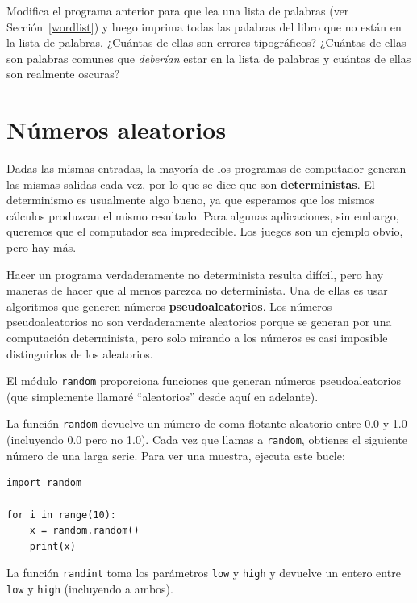 \documentclass[10pt]{book}
\begin{document}
\begin{exercise}

Modifica el programa anterior para que lea una lista de palabras (ver
Sección~\ref{wordlist}) y luego imprima todas las palabras del libro que
no están en la lista de palabras.  ¿Cuántas de ellas son errores tipográficos?
¿Cuántas de ellas son palabras comunes que {\em deberían} estar en la lista
de palabras y cuántas de ellas son realmente oscuras?

\end{exercise}


\section{Números aleatorios}

Dadas las mismas entradas, la mayoría de los programas de computador generan
las mismas salidas cada vez, por lo que se dice que son {\bf deterministas}.
El determinismo es usualmente algo bueno, ya que esperamos que los mismos
cálculos produzcan el mismo resultado.  Para algunas aplicaciones, sin embargo,
queremos que el computador sea impredecible.  Los juegos son un ejemplo
obvio, pero hay más.

Hacer un programa verdaderamente no determinista resulta difícil,
pero hay maneras de hacer que al menos parezca no determinista.  Una de
ellas es usar algoritmos que generen números {\bf pseudoaleatorios}.
Los números pseudoaleatorios no son verdaderamente aleatorios porque se generan
por una computación determinista, pero solo mirando a los números
es casi imposible distinguirlos de los aleatorios.

El módulo {\tt random} proporciona funciones que generan
números pseudoaleatorios (que simplemente llamaré ``aleatorios'' desde
aquí en adelante).

La función {\tt random} devuelve un número de coma flotante aleatorio
entre 0.0 y 1.0 (incluyendo 0.0 pero no 1.0).  Cada vez que
llamas a {\tt random}, obtienes el siguiente número de una larga serie.
Para ver una muestra, ejecuta este bucle:

\begin{verbatim}
import random

for i in range(10):
    x = random.random()
    print(x)
\end{verbatim}
%
La función {\tt randint} toma los parámetros {\tt low} y
{\tt high} y devuelve un entero entre {\tt low} y
{\tt high} (incluyendo a ambos).
\end{document}
